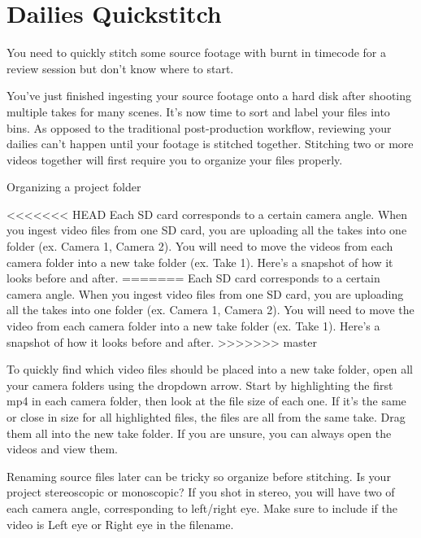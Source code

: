 \chapter{Dailies Quickstitch}
\pagecolor{white}
\label{chap:30}
\begin{fullwidth}

\problem

{\large You need to quickly stitch some source footage with burnt in timecode for a review session but don't know where to start. \par}

You've just finished ingesting your source footage onto a hard disk after shooting multiple takes for many scenes. It's now time to sort and label your files into bins. As opposed to the traditional post-production workflow, reviewing your dailies can't happen until your footage is stitched together. Stitching two or more videos together will first require you to organize your files properly.

\solution

{\large Organizing a project folder \par}

<<<<<<< HEAD
Each SD card corresponds to a certain camera angle. When you ingest video files from one SD card, you are uploading all the takes into one folder (ex. Camera 1, Camera 2). You will need to move the videos from each camera folder into a new take folder (ex. Take 1). Here's a snapshot of how it looks before and after.
=======
Each SD card corresponds to a certain camera angle. When you ingest video files from one SD card, you are uploading all the takes into one folder (ex. Camera 1, Camera 2). You will need to move the video from each camera folder into a new take folder (ex. Take 1). Here's a snapshot of how it looks before and after.
>>>>>>> master


To quickly find which video files should be placed into a new take folder, open all your camera folders using the dropdown arrow. Start by highlighting the first mp4 in each camera folder, then look at the file size of each one. If it's the same or close in size for all highlighted files, the files are all from the same take. Drag them all into the new take folder. If you are unsure, you can always open the videos and view them.

Renaming source files later can be tricky so organize before stitching. Is your project stereoscopic or monoscopic? If you shot in stereo, you will have two of each camera angle, corresponding to left/right eye. Make sure to include if the video is Left eye or Right eye in the filename.


\end{fullwidth}
